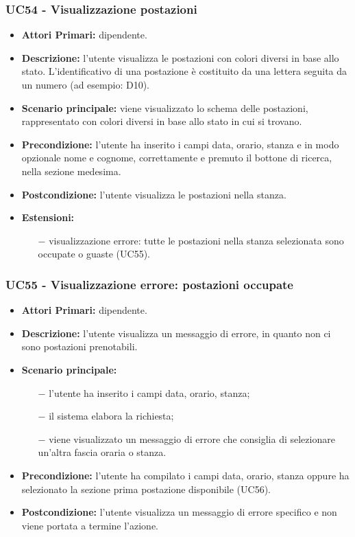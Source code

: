 \subsubsection{ UC54 - Visualizzazione postazioni  }
\begin{itemize}
	\item\textbf{Attori Primari:} dipendente.
	\item\textbf{Descrizione:} l’utente visualizza le postazioni con colori diversi in base allo stato. L'identificativo di una postazione è costituito da una lettera seguita da un numero (ad esempio: D10). 
	\item\textbf{Scenario principale:} viene visualizzato lo schema delle postazioni, rappresentato con colori diversi in base allo stato in cui si trovano.
	\item\textbf{Precondizione:} l’utente ha inserito i campi data, orario, stanza e in modo opzionale nome e cognome, correttamente e premuto il bottone di ricerca, nella sezione 
	medesima.
	\item\textbf{Postcondizione:} l’utente visualizza le postazioni nella stanza.
	\item\textbf{Estensioni:}
	\begin{itemize}
		\item[$-$] visualizzazione errore: tutte le postazioni nella stanza selezionata sono occupate o guaste (UC55).
	\end{itemize}
\end{itemize}
\subsubsection{ UC55 - Visualizzazione errore: postazioni occupate }
\begin{itemize}
	\item\textbf{Attori Primari:} dipendente.
	\item\textbf{Descrizione:} l’utente visualizza un messaggio di errore, in quanto non ci sono postazioni prenotabili.
	\item\textbf{Scenario principale:} 
	\begin{itemize}
		\item[$-$] l’utente ha inserito i campi data, orario, stanza;
		\item[$-$] il sistema elabora la richiesta;
		\item[$-$] viene visualizzato un messaggio di errore che consiglia di selezionare un'altra fascia oraria o stanza.
	\end{itemize}
	\item\textbf{Precondizione:} l’utente ha compilato i campi data, orario, stanza oppure ha selezionato la sezione prima postazione disponibile (UC56).
	\item\textbf{Postcondizione:} l’utente visualizza un messaggio di errore specifico e non viene portata a termine l'azione.
\end{itemize}

